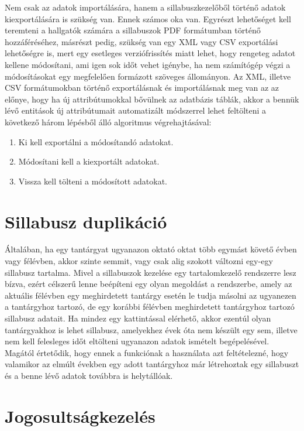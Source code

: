 \documentclass[hidelinks, 12pt, a4paper]{report}
\begin{document}
Nem csak az adatok importálására, hanem a sillabuszkezelőből történő adatok kiexportálására is szükség van. Ennek számos oka van. Egyrészt lehetőséget kell teremteni a hallgatók számára a sillabuszok PDF formátumban történő hozzáféréséhez, másrészt pedig, szükség van egy XML vagy CSV exportálási lehetőségre is, mert egy esetleges verziófrissítés miatt lehet, hogy rengeteg adatot kellene módosítani, ami igen sok időt vehet igénybe, ha nem számítógép végzi a módosításokat egy megfelelően formázott szöveges állományon. Az XML, illetve CSV formátumokban történő exportálásnak és importálásnak meg van az az előnye, hogy ha új attribútumokkal bővülnek az adatbázis táblák, akkor a bennük lévő entitások új attribútumait automatizált módszerrel lehet feltölteni a következő három lépésből álló algoritmus végrehajtásával:

\begin{enumerate}
\item Ki kell exportálni a módosítandó adatokat.
\item Módosítani kell a kiexportált adatokat.
\item Vissza kell tölteni a módosított adatokat.
\end{enumerate}

\section{Sillabusz duplikáció}

Általában, ha egy tantárgyat ugyanazon oktató oktat több egymást követő évben vagy félévben, akkor szinte semmit, vagy csak alig szokott változni egy-egy sillabusz tartalma. Mivel a sillabuszok kezelése egy tartalomkezelő rendszerre lesz bízva, ezért célszerű lenne beépíteni egy olyan megoldást a rendszerbe, amely az aktuális félévben egy meghirdetett tantárgy esetén le tudja másolni az ugyanezen a tantárgyhoz tartozó, de egy korábbi félévben meghirdetett tantárgyhoz tartozó sillabusz adatait. Ha mindez egy kattintással elérhető, akkor ezentúl olyan tantárgyakhoz is lehet sillabusz, amelyekhez évek óta nem készült egy sem, illetve nem kell felesleges időt eltölteni ugyanazon adatok ismételt begépelésével. Magától értetődik, hogy ennek a funkciónak a használata azt feltételezné, hogy valamikor az elmúlt években egy adott tantárgyhoz már létrehoztak egy sillabuszt és a benne lévő adatok továbbra is helytállóak.

\section{Jogosultságkezelés}
\end{document}
